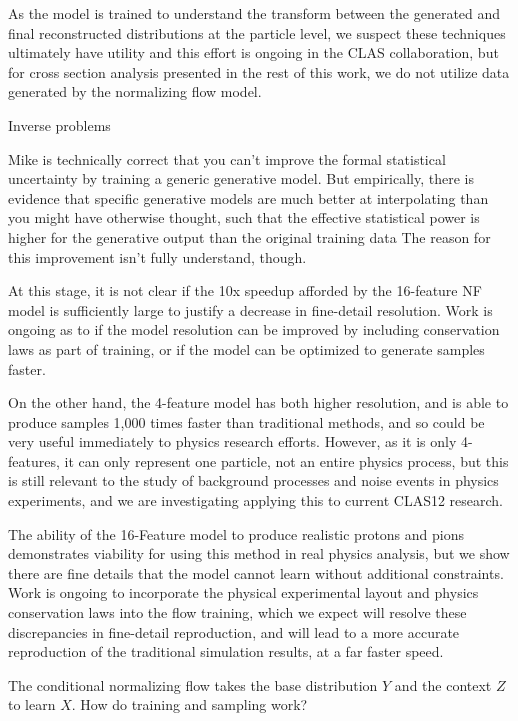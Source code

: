  As the model is trained to understand the transform between the generated and final reconstructed distributions at the particle level, we suspect these techniques ultimately have utility and this effort is ongoing in the CLAS collaboration, but for cross section analysis presented in the rest of this work, we do not utilize data generated by the normalizing flow model.  
 




 \iffalse
Inverse problems

Mike is technically correct that you can't improve the formal statistical uncertainty by training a generic generative model.  But empirically, there is evidence that specific generative models are much better at interpolating than you might have otherwise thought, such that the effective statistical power is higher for the generative output than the original training data  The reason for this improvement isn't fully understand, though.
 
 At this stage, it is not clear if the 10x speedup afforded by the 16-feature NF model is sufficiently large to justify a decrease in fine-detail resolution. Work is ongoing as to if the model resolution can be improved by including conservation laws as part of training, or if the model can be optimized to generate samples faster. 
        
        On the other hand, the 4-feature model has both higher resolution, and is able to produce samples 1,000 times faster than traditional methods, and so could be very useful immediately to physics research efforts. However, as it is only 4-features, it can only represent one particle, not an entire physics process, but this is still relevant to the study of background processes and noise events in physics experiments, and we are investigating applying this to current CLAS12 research.
        
        The ability of the 16-Feature model to produce realistic protons and pions demonstrates viability for using this method in real physics analysis, but we show there are fine details that the model cannot learn without additional constraints. Work is ongoing to incorporate the physical experimental layout and physics conservation laws into the flow training, which we expect will resolve these discrepancies in fine-detail reproduction, and will lead to a more accurate reproduction of the traditional simulation results, at a far faster speed. 

    The conditional normalizing flow takes the base distribution $Y$ and the context $Z$ to learn $X$. How do training and sampling work? 


